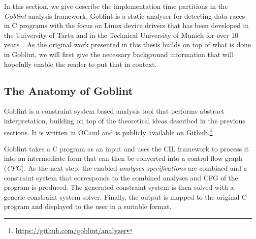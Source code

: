 \documentclass[..thesis.tex]{subfiles}
\begin{document}

In this section, we give describe the implementation time partitions in the
\textit{Goblint} analysis framework. Goblint is a static analyser for detecting
data races in C programs with the focus on Linux device drivers that has been
developed in the University of Tartu and in the Technical University of Munich
for over 10 years~\cite{vojdanivene_2009,vojdanivesal_static_2010,apinis_frameworks_2014,vojdani_static_2016}.
As the original work presented in this thesis builds on top of what is done in Goblint,
we will first give the necessary background information that will hopefully enable the reader to put that in context.



\subsection{The Anatomy of Goblint}

Goblint is a constraint system based analysis tool that performs abstract interpretation,
building on top of the theoretical ideas described in the previous sections.
It is written in OCaml and is publicly available on Github.\footnote{\url{https://github.com/goblint/analyzer}}

Goblint takes a C program as an input and uses the CIL framework \cite{necula_cil:_2002} to process it into an intermediate form that can then be converted into a control flow graph (\textit{CFG}). 
%
As the next step, the enabled \textit{analyses specifications} are combined and a constraint system that corresponds to the combined analyses and CFG of the program is produced.
%
The generated constraint system is then solved with a generic constraint system solver. 
%
Finally, the output is mapped to the original C program and displayed to the user in a suitable format.
\end{document}
